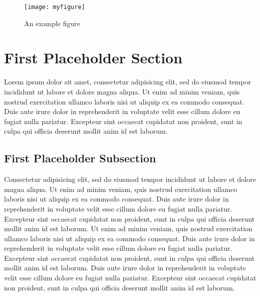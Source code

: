 \documentclass[a4paper]{article}
\begin{document}
\begin{figure}[t] \centering
\texttt{[image: myfigure]}
\caption{An example figure} \label{fig:my_figure}
\end{figure}


\section{First Placeholder Section}
Lorem ipsum dolor sit amet, consectetur adipisicing elit, sed do eiusmod tempor
incididunt ut labore et dolore magna aliqua. Ut enim ad minim veniam, quis
nostrud exercitation ullamco laboris nisi ut aliquip ex ea commodo consequat.
Duis aute irure dolor in reprehenderit in voluptate velit esse cillum dolore eu
fugiat nulla pariatur. Excepteur sint occaecat cupidatat non proident, sunt in
culpa qui officia deserunt mollit anim id est laborum.

\subsection{First Placeholder Subsection}
Consectetur adipisicing elit, sed do eiusmod tempor incididunt ut labore et
dolore magna aliqua. Ut enim ad minim veniam, quis nostrud exercitation ullamco
laboris nisi ut aliquip ex ea commodo consequat. Duis aute irure dolor in
reprehenderit in voluptate velit esse cillum dolore eu fugiat nulla pariatur.
Excepteur sint occaecat cupidatat non proident, sunt in culpa qui officia
deserunt mollit anim id est laborum. Ut enim ad minim veniam, quis nostrud
exercitation ullamco laboris nisi ut aliquip ex ea commodo consequat. Duis aute
irure dolor in reprehenderit in voluptate velit esse cillum dolore eu fugiat
nulla pariatur. Excepteur sint occaecat cupidatat non proident, sunt in culpa
qui officia deserunt mollit anim id est laborum. Duis aute irure dolor in
reprehenderit in voluptate velit esse cillum dolore eu fugiat nulla pariatur.
Excepteur sint occaecat cupidatat non proident, sunt in culpa qui officia
deserunt mollit anim id est laborum.
\end{document}

